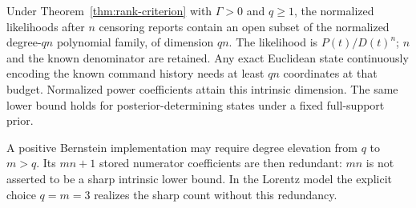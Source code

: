 \begin{theorem}\label{thm:q-dimension}
Under Theorem~\ref{thm:rank-criterion} with $\Gamma>0$ and $q\ge1$, the
normalized likelihoods after $n$ censoring reports contain an open subset
of the normalized degree-$qn$ polynomial family, of dimension $qn$.
The likelihood is $P(t)/D(t)^n$; $n$ and the known denominator are retained.
Any exact Euclidean state continuously encoding the known command history
needs at least $qn$ coordinates at that budget. Normalized power
coefficients attain this intrinsic dimension. The same lower bound holds
for posterior-determining states under a fixed full-support prior.

A positive Bernstein implementation may require degree elevation from $q$
to $m>q$. Its $mn+1$ stored numerator coefficients are then redundant:
$mn$ is not asserted to be a sharp intrinsic lower bound. In the Lorentz
model the explicit choice $q=m=3$ realizes the sharp count without this
redundancy.
\end{theorem}
